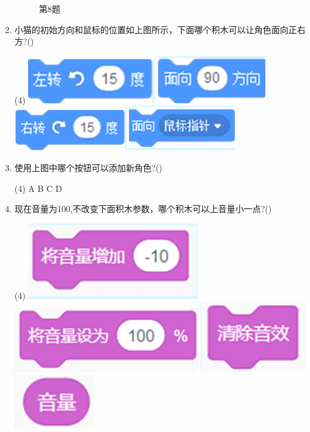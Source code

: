 \documentclass[10.5pt, a4paper]{article}
\begin{document}
\begin{enumerate}
\begin{figure}[htbp]
\begin{minipage}[t]{.38\textwidth}
\begin{minipage}[t]{.48\textwidth}
                \end{minipage}
                \caption*{第8题}
            \end{minipage}
        \end{figure}

        \item 小猫的初始方向和鼠标的位置如上图所示，下面哪个积木可以让角色面向正右方?(\qquad)
        \begin{tasks}(4)
            \task \includegraphics[width=.12\textwidth]{5a.png}
            \task \includegraphics[width=.12\textwidth]{5b.png}
            \task \includegraphics[width=.12\textwidth]{5c.png}
            \task \includegraphics[width=.12\textwidth]{5d.png}
        \end{tasks}

        \item 使用上图中哪个按钮可以添加新角色?(\qquad)
        \begin{tasks}(4)
            \task A
            \task B
            \task C
            \task D
        \end{tasks}

        \item 现在音量为100,不改变下面积木参数，哪个积木可以上音量小一点?(\qquad)
        \begin{tasks}(4)
            \task \includegraphics[width=.13\textwidth]{7a.png}
            \task \includegraphics[width=.15\textwidth]{7b.png}
            \task \includegraphics[width=.09\textwidth]{7c.png}
            \task \includegraphics[width=.06\textwidth]{7d.png}
        \end{tasks}
        

\end{enumerate}
\end{document}
